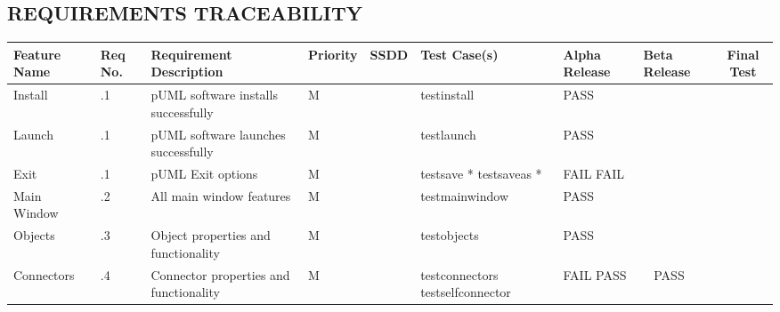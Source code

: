 \documentclass[twoside,letterpaper]{article}
\begin{document}
\begin{landscape}

\section[REQUIREMENTS TRACEABILITY]
  {\bfseries REQUIREMENTS TRACEABILITY}
{\itshape }

\bigskip

\begin{flushleft}
\tablehead{}
\begin{supertabular}[c]{|
                        m{0.9in}|m{0.4in}|m{2.0in}|
                        m{0.4in}|m{0.5in}|m{1.0in}|
                        m{1.0in}|m{1.0in}|c|
                       }
\hline
 
  \centering \bfseries Feature Name &
  \centering \bfseries Req No. &
  \centering \bfseries Requirement Description &
  \centering \bfseries Priority &
  \centering \bfseries SSDD &
  \centering \bfseries Test Case(s) & 
  \centering \bfseries Alpha Release &
  \centering \bfseries Beta Release &
  \bfseries Final Test
\\\hline
  
  Install
  & .1
  & pUML software installs successfully
  & \centering M 
  & ~
  & testinstall
  & PASS
  & ~ 
  & ~ 
\\\hline

  Launch
  & .1
  & pUML software launches successfully
  & \centering M 
  & ~
  & testlaunch
  & PASS
  & ~ 
  & ~ 
\\\hline

  Exit
  & .1
  & pUML Exit options 
  & \centering M 
  & ~
  & testsave *\newline
    testsaveas *
  & FAIL \newline
    FAIL 
  & ~ \newline
    ~
  & ~ \newline
    ~
\\\hline

  Main Window
  & .2
  & All main window features 
  & \centering M 
  & ~
  & testmainwindow 
  & PASS
  & ~ 
  & ~ 
\\\hline

  Objects
  & .3
  & Object properties and functionality
  & \centering M 
  & ~ 
  & testobjects
  & PASS
  & ~ 
  & ~ 
\\\hline

  Connectors
  & .4
  & Connector properties and functionality
  & \centering M 
  & ~ 
  & testconnectors\newline 
    testselfconnector
  & FAIL \newline
    PASS
  & ~ \newline
    PASS
  & ~ \newline
    ~
\\\hline


\end{supertabular}
\end{flushleft}
\end{landscape}
\end{document}
